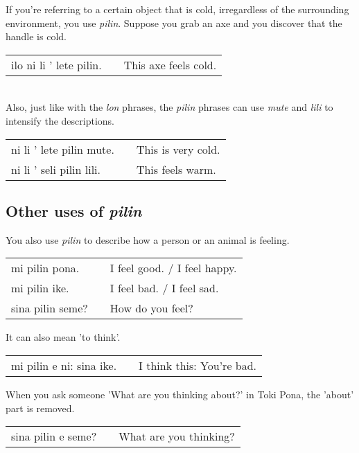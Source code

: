 {If you're referring to a certain object that is cold, irregardless of the surrounding environment, you use \textit{pilin}.  
Suppose you grab an axe and you discover that the handle is cold. 

\begin{supertabular}{p{5,5cm}|ll}
ilo ni li ' lete pilin. && This axe feels cold. \\
\end{supertabular} \\

Also, just like with the \textit{lon} phrases, the \textit{pilin} phrases can use \textit{mute} and \textit{lili} to intensify the descriptions. 

\begin{supertabular}{p{5,5cm}|ll}
ni li ' lete pilin mute. && This is very cold. \\
ni li ' seli pilin lili. && This feels warm. \\
\end{supertabular} 
%
\subsection*{Other uses of \textit{pilin}}
%
%
You also use \textit{pilin} to describe how a person or an animal is feeling. 

\begin{supertabular}{p{5,5cm}|ll}
mi pilin pona. && I feel good. / I feel happy. \\
mi pilin ike. && I feel bad. / I feel sad. \\
sina pilin seme? && How do you feel? \\ 
\end{supertabular} 

It can also mean 'to think'.

\begin{supertabular}{p{5,5cm}|ll}
mi pilin e ni: sina ike. && I think this: You're bad. \\ 
\end{supertabular} 

When you ask someone 'What are you thinking about?' in Toki Pona, the 'about' part is removed. 

\begin{supertabular}{p{5,5cm}|ll}
sina pilin e seme? && What are you thinking? \\
\end{supertabular} 

}
